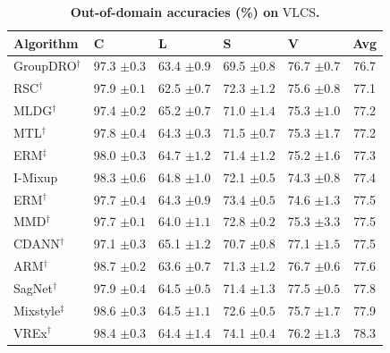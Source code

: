 \documentclass[10pt]{article}
\newcommand{\data}[1]{\textsc{#1}}
\begin{document}
\begin{table}[H]
\centering
\small
\renewcommand{\arraystretch}{1.1}
\caption{\small\textbf{Out-of-domain accuracies (\%) on} \data{VLCS}\textbf{.}}
\begin{tabular}{lllll|c}
\toprule
\textbf{Algorithm} & \textbf{C} & \textbf{L} & \textbf{S} & \textbf{V} & \textbf{Avg} \\
\midrule
GroupDRO$^\dagger$ & 97.3 \scriptsize$\pm0.3$ & 63.4 \scriptsize$\pm0.9$ & 69.5 \scriptsize$\pm0.8$ & 76.7 \scriptsize$\pm0.7$ & 76.7 \\
RSC$^\dagger$ & 97.9 \scriptsize$\pm0.1$ & 62.5 \scriptsize$\pm0.7$ & 72.3 \scriptsize$\pm1.2$ & 75.6 \scriptsize$\pm0.8$ & 77.1 \\
MLDG$^\dagger$ & 97.4 \scriptsize$\pm0.2$ & 65.2 \scriptsize$\pm0.7$ & 71.0 \scriptsize$\pm1.4$ & 75.3 \scriptsize$\pm1.0$ & 77.2 \\
MTL$^\dagger$ & 97.8 \scriptsize$\pm0.4$ & 64.3 \scriptsize$\pm0.3$ & 71.5 \scriptsize$\pm0.7$ & 75.3 \scriptsize$\pm1.7$ & 77.2 \\
ERM$^\ddagger$ & 98.0 \scriptsize$\pm0.3$ & 64.7 \scriptsize$\pm1.2$ & 71.4 \scriptsize$\pm1.2$ & 75.2 \scriptsize$\pm1.6$ & 77.3 \\
I-Mixup & 98.3 \scriptsize$\pm0.6$ & 64.8 \scriptsize$\pm1.0$ & 72.1 \scriptsize$\pm0.5$ & 74.3 \scriptsize$\pm0.8$ & 77.4 \\
ERM$^\dagger$ & 97.7 \scriptsize$\pm0.4$ & 64.3 \scriptsize$\pm0.9$ & 73.4 \scriptsize$\pm0.5$ & 74.6 \scriptsize$\pm1.3$ & 77.5 \\
MMD$^\dagger$ & 97.7 \scriptsize$\pm0.1$ & 64.0 \scriptsize$\pm1.1$ & 72.8 \scriptsize$\pm0.2$ & 75.3 \scriptsize$\pm3.3$ & 77.5 \\
CDANN$^\dagger$ & 97.1 \scriptsize$\pm0.3$ & 65.1 \scriptsize$\pm1.2$ & 70.7 \scriptsize$\pm0.8$ & 77.1 \scriptsize$\pm1.5$ & 77.5 \\
ARM$^\dagger$ & 98.7 \scriptsize$\pm0.2$ & 63.6 \scriptsize$\pm0.7$ & 71.3 \scriptsize$\pm1.2$ & 76.7 \scriptsize$\pm0.6$ & 77.6 \\
SagNet$^\dagger$ & 97.9 \scriptsize$\pm0.4$ & 64.5 \scriptsize$\pm0.5$ & 71.4 \scriptsize$\pm1.3$ & 77.5 \scriptsize$\pm0.5$ & 77.8 \\
Mixstyle$^\ddagger$ & 98.6 \scriptsize$\pm0.3$ & 64.5 \scriptsize$\pm1.1$ & 72.6 \scriptsize$\pm0.5$ & 75.7 \scriptsize$\pm1.7$ & 77.9 \\
VREx$^\dagger$ & 98.4 \scriptsize$\pm0.3$ & 64.4 \scriptsize$\pm1.4$ & 74.1 \scriptsize$\pm0.4$ & 76.2 \scriptsize$\pm1.3$ & 78.3 \\

\end{tabular}
\end{table}
\end{document}

